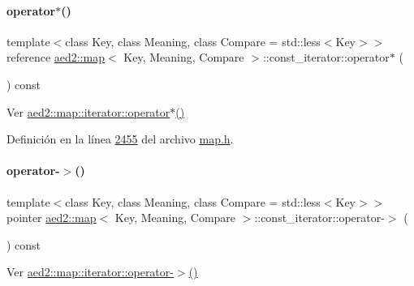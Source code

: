 \paragraph{\texorpdfstring{operator$\ast$()}{operator*()}}
{\footnotesize\ttfamily template$<$class Key, class Meaning, class Compare = std\+::less$<$\+Key$>$$>$ \\
reference \hyperlink{classaed2_1_1map}{aed2\+::map}$<$ Key, Meaning, Compare $>$\+::const\+\_\+iterator\+::operator$\ast$ (\begin{DoxyParamCaption}{ }\end{DoxyParamCaption}) const\hspace{0.3cm}{\ttfamily [inline]}}



Ver \hyperlink{classaed2_1_1map_1_1iterator_ab115711d0295146906830840590d900a_ab115711d0295146906830840590d900a}{aed2\+::map\+::iterator\+::operator$\ast$()} 



Definición en la línea \hyperlink{map_8h_source_l02455}{2455} del archivo \hyperlink{map_8h_source}{map.\+h}.

\mbox{\label{classaed2_1_1map_1_1const__iterator_a07700cccc763da67d42c84d20f4e1d1b_a07700cccc763da67d42c84d20f4e1d1b}} 
\paragraph{\texorpdfstring{operator-\/$>$()}{operator->()}}
{\footnotesize\ttfamily template$<$class Key, class Meaning, class Compare = std\+::less$<$\+Key$>$$>$ \\
pointer \hyperlink{classaed2_1_1map}{aed2\+::map}$<$ Key, Meaning, Compare $>$\+::const\+\_\+iterator\+::operator-\/$>$ (\begin{DoxyParamCaption}{ }\end{DoxyParamCaption}) const\hspace{0.3cm}{\ttfamily [inline]}}



Ver \hyperlink{classaed2_1_1map_1_1iterator_a712522d62f461c1eb9b02ecf248bae8c_a712522d62f461c1eb9b02ecf248bae8c}{aed2\+::map\+::iterator\+::operator-\/$>$()} 



